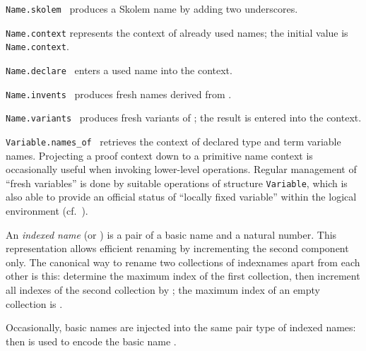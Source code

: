 \begin{isabellebody}
\begin{isamarkuptext}
\begin{description}
  \item \verb|Name.skolem|~ produces a Skolem name by
  adding two underscores.

  \item \verb|Name.context| represents the context of already used
  names; the initial value is \verb|Name.context|.

  \item \verb|Name.declare|~ enters a used name into the
  context.

  \item \verb|Name.invents|~ produces  fresh names derived from .

  \item \verb|Name.variants|~ produces fresh
  variants of ; the result is entered into the context.

  \item \verb|Variable.names_of|~ retrieves the context
  of declared type and term variable names.  Projecting a proof
  context down to a primitive name context is occasionally useful when
  invoking lower-level operations.  Regular management of ``fresh
  variables'' is done by suitable operations of structure \verb|Variable|, which is also able to provide an official status of
  ``locally fixed variable'' within the logical environment (cf.\
  ).

  \end{description}%
\end{isamarkuptext}%
\isamarkuptrue%
%
\endisatagmlref
{\isafoldmlref}%
%
\isadelimmlref
%
\endisadelimmlref
%
\isamarkuptrue%
%
\begin{isamarkuptext}%
An \emph{indexed name} (or ) is a pair of a basic
  name and a natural number.  This representation allows efficient
  renaming by incrementing the second component only.  The canonical
  way to rename two collections of indexnames apart from each other is
  this: determine the maximum index \isa{maxidx} of the first
  collection, then increment all indexes of the second collection by
  \isa{maxidx\ {\isacharplus}\ {\isadigit{1}}}; the maximum index of an empty collection is
  \isa{{\isacharminus}{\isadigit{1}}}.

  Occasionally, basic names are injected into the same pair type of
  indexed names: then  is used to encode the basic
  name \isa{x}.


\end{isamarkuptext}
\end{isabellebody}
